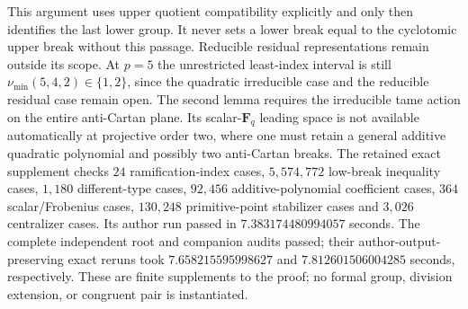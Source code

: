 \begin{remark}
\label{rem:B-RD58-scope}
This argument uses upper quotient compatibility explicitly and only
then identifies the last lower group. It never sets a lower break
equal to the cyclotomic upper break without this passage.
Reducible residual representations remain outside its scope.
At $p=5$ the unrestricted least-index interval is still
$\nu_{\min}(5,4,2)\in\{1,2\}$, since the quadratic irreducible
case and the reducible residual case remain open.
The second lemma requires the irreducible tame action on the entire
anti-Cartan plane. Its scalar-$\mathbf F_q$ leading space is not
available automatically at projective order two, where one must
retain a general additive quadratic polynomial and possibly two
anti-Cartan breaks.
The retained exact supplement
checks $24$ ramification-index cases, $5{,}574{,}772$ low-break
inequality cases, $1{,}180$ different-type cases, $92{,}456$
additive-polynomial coefficient cases, $364$ scalar/Frobenius cases,
$130{,}248$ primitive-point stabilizer cases and $3{,}026$ centralizer
cases. Its author run passed in $7.383174480994057$ seconds.
The complete independent root and companion audits passed; their
author-output-preserving exact reruns took $7.658215595998627$
and $7.812601506004285$ seconds, respectively.
These are finite supplements to the proof; no formal group,
division extension, or congruent pair is instantiated.
\end{remark}
